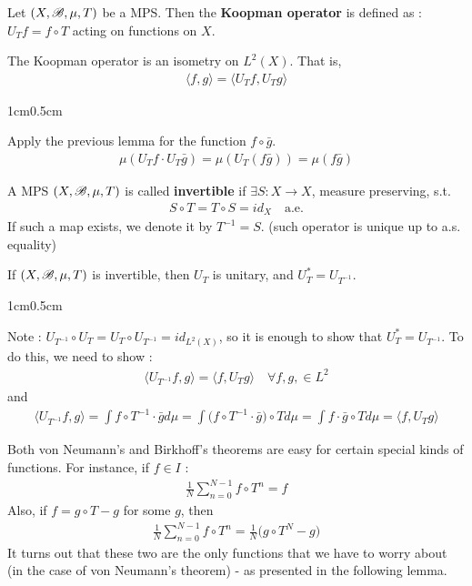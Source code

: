 \documentclass[12pt,a4paper]{report}
\newenvironment{proof}
{\begin{changemargin}{1cm}{0.5cm} 
	}%
	{\end{changemargin}
}
\begin{document}
 Let $(X,\mathscr{B}, \mu, T)$ be a MPS. Then the \textbf{Koopman operator} is defined as : $U_T f = f\circ T$ acting on functions on $X$.
\s

\lem The Koopman operator is an isometry on $L^2(X)$. That is,
\begin{align*}
\langle f,g\rangle = \langle U_T f, U_T g \rangle
\end{align*}
\begin{proof}
\pf Apply the previous lemma for the function $f\circ \bar{g}$.
\begin{align*}
\mu(U_T f \cdot U_T \bar{g}) = \mu(U_T(f\bar{g})) = \mu(f\bar{g})
\end{align*}

\eop
\end{proof}
\s

 A MPS $(X,\mathscr{B}, \mu, T)$ is called \textbf{invertible} if $\exists S:X\rightarrow X$, measure preserving, s.t.
\begin{align*}
S\circ T = T\circ S= id_X \quad \text{a.e.}
\end{align*}
If such a map exists, we denote it by $T^{-1} = S$. (such operator is unique up to a.s. equality)
\s

\lem If $(X,\mathscr{B}, \mu, T)$ is invertible, then $U_T$ is unitary, and $U^*_T = U_{T^{-1}}$.

\begin{proof}
\pf Note : $U_{T^{-1}} \circ U_T = U_T \circ U_{T^{-1}} = id_{L^2(X)}$, so it is enough to show that $U^*_T = U_{T^{-1}}$. To do this, we need to show :
\begin{align*}
\langle U_{T^{-1}} f, g\rangle = \langle f, U_T g\rangle \quad \forall f,g, \in L^2
\end{align*}
and
\begin{align*}
\langle U_{T^{-1}} f, g\rangle = \int f\circ T^{-1} \cdot \bar{g} d\mu = \int \Big( f\circ T^{-1} \cdot \bar{g}  \Big) \circ T d\mu = \int f\cdot \bar{g} \circ T d\mu = \langle f, U_T g\rangle
\end{align*}

\eop
\end{proof}
\s

\quad Both von Neumann's and Birkhoff's theorems are easy for certain special kinds of functions. For instance, if $f\in I$ :
\begin{align*}
\frac{1}{N} \sum_{n=0}^{N-1} f\circ T^n =f
\end{align*}
Also, if $f= g \circ T -g$ for some $g$, then
\begin{align*}
\frac{1}{N} \sum_{n=0}^{N-1} f\circ T^n = \frac{1}{N}\big( g\circ T^N - g \big)
\end{align*}
It turns out that these two are the only functions that we have to worry about (in the case of von Neumann's theorem) - as presented in the following lemma.
\s
\end{document}
